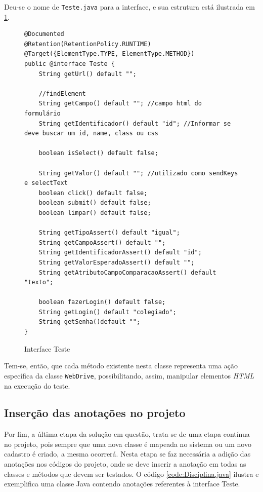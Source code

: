 \documentclass[tg]{mdtufsm}
\begin{document}
Deu-se o nome de \texttt{Teste.java} para a interface, e sua estrutura está ilustrada em \ref{code:Teste.java}.

\begin{figure}[!htt]
\begin{lstlisting}
@Documented
@Retention(RetentionPolicy.RUNTIME)
@Target({ElementType.TYPE, ElementType.METHOD})
public @interface Teste {
    String getUrl() default "";

    //findElement
    String getCampo() default ""; //campo html do formulário
    String getIdentificador() default "id"; //Informar se deve buscar um id, name, class ou css

    boolean isSelect() default false;

    String getValor() default ""; //utilizado como sendKeys e selectText
    boolean click() default false;
    boolean submit() default false;
    boolean limpar() default false;

    String getTipoAssert() default "igual";
    String getCampoAssert() default "";
    String getIdentificadorAssert() default "id";
    String getValorEsperadoAssert() default "";
    String getAtributoCampoComparacaoAssert() default "texto";

    boolean fazerLogin() default false;
    String getLogin() default "colegiado";
    String getSenha()default "";
}
\end{lstlisting}
	\caption{Interface Teste}
	\label{code:Teste.java}
\end{figure}

Tem-se, então, que cada método existente nesta classe representa uma ação específica da classe \texttt{WebDrive}, possibilitando, assim, manipular elementos \emph{HTML} na execução do teste.

\subsection{Inserção das anotações no projeto}
Por fim, a última etapa da solução em questão, trata-se de uma etapa contínua no projeto, pois sempre que uma nova classe é mapeada no sistema ou um novo cadastro é criado, a mesma ocorrerá. Nesta etapa se faz necessária a
adição das anotações nos códigos do projeto, onde se deve inserir a anotação em todas as classes e métodos que devem ser testados.
O código \ref{code:Disciplina.java} ilustra e exemplifica uma classe Java contendo anotações referentes à interface Teste.
\end{document}

